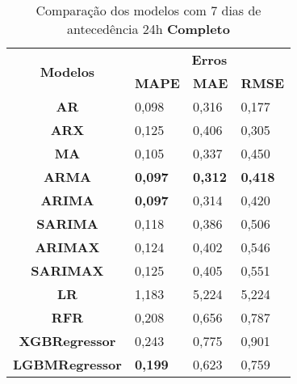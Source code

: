 \begin{table}[H]
	\centering
	\caption{Comparação dos modelos com 7 dias de antecedência 24h \textbf{Completo} }\label{tb:10-24cm}
	\begin{tabular}{@{}clll@{}}
		\toprule
		\multirow{2}{*}{\textbf{Modelos}} & \multicolumn{3}{c}{\textbf{Erros}}                                                                       \\ \cmidrule(l){2-4} 
		& \multicolumn{1}{c}{\textbf{MAPE}} & \multicolumn{1}{c}{\textbf{MAE}} & \multicolumn{1}{c}{\textbf{RMSE}} \\ \hline
\textbf{AR}                       & 0,098                             & 0,316                            & 0,177                             \\
\textbf{ARX}                      & 0,125                             & 0,406                            & 0,305                             \\
\textbf{MA}                       & 0,105                             & 0,337                            & 0,450                             \\
\textbf{ARMA}                     & \textbf{0,097}                             & \textbf{0,312}                            & \textbf{0,418}                             \\
\textbf{ARIMA}                    & \textbf{0,097}                             & 0,314                            & 0,420                             \\
\textbf{SARIMA}                   & 0,118                             & 0,386                            & 0,506                             \\
\textbf{ARIMAX}                   & 0,124                             & 0,402                            & 0,546                             \\
\textbf{SARIMAX}                  & 0,125                             & 0,405                            & 0,551                             \\
\textbf{LR}                       & 1,183                             & 5,224                            & 5,224                             \\
\textbf{RFR}                      & 0,208                             & 0,656                            & 0,787                             \\
\textbf{XGBRegressor}             & 0,243                             & 0,775                            & 0,901                             \\
\textbf{LGBMRegressor}            & \textbf{0,199}                             & 0,623                            & 0,759                             \\ \bottomrule
	\end{tabular}

\end{table}


